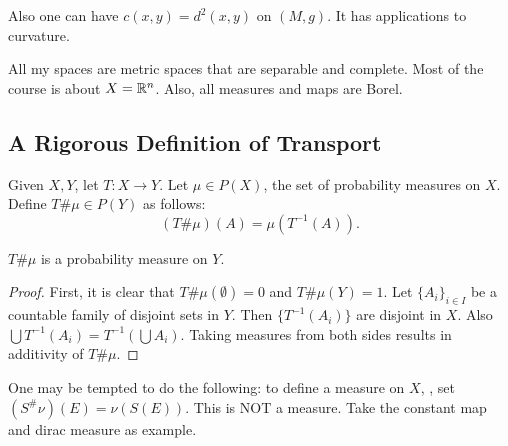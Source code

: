 \documentclass[oneside,leqno,11pt]{amsart}
\numberwithin{equation}{section}
\begin{document}
Also one can have $c(x,y) = d^2(x,y)$ on $(M,g)$. It has applications to curvature. 

\begin{remark}
    All my spaces are metric spaces that are separable and complete. Most of the course is about $X = \mathbb{R}^n$. Also, all measures  and maps are Borel.
\end{remark}

\subsection{A Rigorous Definition of Transport}
\begin{definition}
    Given $X,Y$, let $T:X\to Y$. Let $\mu \in P(X)$, the set of probability measures on $X$. Define $T\#\mu \in P(Y)$ as follows:
    \[
        (T\#\mu)(A) = \mu(T^{-1}(A)).
    \] 
\end{definition}
\begin{lemma}
    $T\#\mu$ is a probability measure on $Y$.
\end{lemma}
\begin{proof}
    First, it is clear that $T\#\mu(\emptyset) = 0$ and $T\#\mu(Y) = 1$. Let $\{A_i\}_{i\in I}$ be a countable family of disjoint sets in $Y$. Then $\{T^{-1}(A_i)\}$ are disjoint in $X$. Also $\bigcup T^{-1}(A_i) = T^{-1}(\bigcup A_i)$. Taking measures from both sides results in additivity of $T\#\mu$.  
\end{proof}

\begin{remark}
    One may be tempted to do the following: to define a measure on $X$, \eg, set $(S^\#\nu)(E) = \nu(S(E))$. This is NOT a measure. Take the constant map and dirac measure as example. 
\end{remark}
\end{document}
